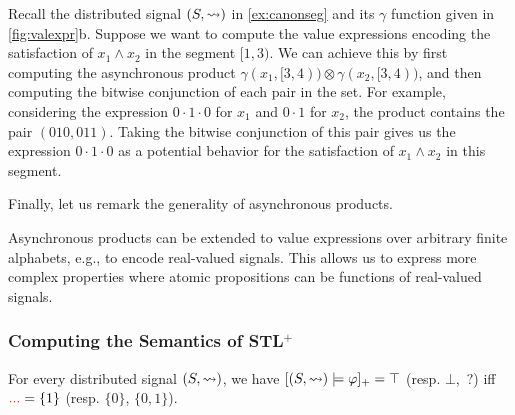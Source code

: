 \begin{example}
	Recall the distributed signal $(S, {\rightsquigarrow})$ in \cref{ex:canonseg} and its $\gamma$ function given in \cref{fig:valexpr}b.
	Suppose we want to compute the value expressions encoding the satisfaction of $x_1 \land x_2$ in the segment $[1,3)$.
	We can achieve this by first computing the asynchronous product $\gamma(x_1, [3,4)) \otimes \gamma(x_2, [3,4))$, and then computing the bitwise conjunction of each pair in the set.
	For example, considering the expression $0 \cdot 1 \cdot 0$ for $x_1$ and $0 \cdot 1$ for $x_2$, the product contains the pair $(010, 011)$.
	Taking the bitwise conjunction of this pair gives us the expression $0 \cdot 1 \cdot 0$ as a potential behavior for the satisfaction of $x_1 \land x_2$ in this segment.
\end{example}

Finally, let us remark the generality of asynchronous products.

\begin{remark}
	Asynchronous products can be extended to value expressions over arbitrary finite alphabets, e.g., to encode real-valued signals.
	This allows us to express more complex properties where atomic propositions can be functions of real-valued signals.
\end{remark}

\subsubsection{Computing the Semantics of STL$^+$}
\TODO


\begin{lemma} \label{cl:algo}
	For every distributed signal $(S,{\rightsquigarrow})$, we have $[(S,{\rightsquigarrow}) \models \varphi]_+ = \top$ (resp. $\bot$, ${\,?}$) iff $\textcolor{red}{...} = \{1\}$ (resp. $\{0\}$, $\{0,1\}$).
%		
\end{lemma}




